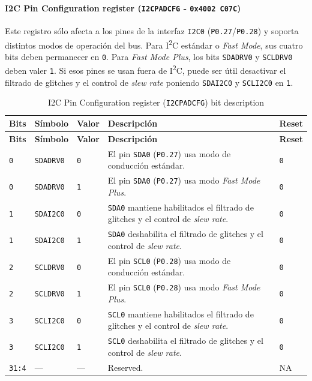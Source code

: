 \paragraph{I2C Pin Configuration register (\texttt{I2CPADCFG} - \texttt{0x4002 C07C})}
Este registro sólo afecta a los pines de la interfaz \texttt{I2C0} (\texttt{P0.27}/\texttt{P0.28}) y soporta distintos modos de operación del bus. Para I\textsuperscript{2}C estándar o \textit{Fast Mode}, sus cuatro bits deben permanecer en \texttt{0}. Para \textit{Fast Mode Plus}, los bits \texttt{SDADRV0} y \texttt{SCLDRV0} deben valer \texttt{1}. Si esos pines se usan fuera de I\textsuperscript{2}C, puede ser útil desactivar el filtrado de glitches y el control de \textit{slew rate} poniendo \texttt{SDAI2C0} y \texttt{SCLI2C0} en \texttt{1}.

\begin{longtable}{|>{\raggedright\arraybackslash}p{}|>{\raggedright\arraybackslash}p{}|>{\raggedright\arraybackslash}p{}|>{\raggedright\arraybackslash}p{}|>{\centering\arraybackslash}p{}|}
\caption{I2C Pin Configuration register (\texttt{I2CPADCFG}) bit description}\\
\hline
\textbf{Bits} & \textbf{Símbolo} & \textbf{Valor} & \textbf{Descripción} & \textbf{Reset} \\
\hline
\endfirsthead
\hline
\textbf{Bits} & \textbf{Símbolo} & \textbf{Valor} & \textbf{Descripción} & \textbf{Reset} \\
\hline
\endhead
\texttt{0} & \texttt{SDADRV0} & \texttt{0} & El pin \texttt{SDA0} (\texttt{P0.27}) usa modo de conducción estándar. & \texttt{0} \\
\hline
\texttt{0} & \texttt{SDADRV0} & \texttt{1} & El pin \texttt{SDA0} (\texttt{P0.27}) usa modo \textit{Fast Mode Plus}. & \texttt{0} \\
\hline
\texttt{1} & \texttt{SDAI2C0} & \texttt{0} & \texttt{SDA0} mantiene habilitados el filtrado de glitches y el control de \textit{slew rate}. & \texttt{0} \\
\hline
\texttt{1} & \texttt{SDAI2C0} & \texttt{1} & \texttt{SDA0} deshabilita el filtrado de glitches y el control de \textit{slew rate}. & \texttt{0} \\
\hline
\texttt{2} & \texttt{SCLDRV0} & \texttt{0} & El pin \texttt{SCL0} (\texttt{P0.28}) usa modo de conducción estándar. & \texttt{0} \\
\hline
\texttt{2} & \texttt{SCLDRV0} & \texttt{1} & El pin \texttt{SCL0} (\texttt{P0.28}) usa modo \textit{Fast Mode Plus}. & \texttt{0} \\
\hline
\texttt{3} & \texttt{SCLI2C0} & \texttt{0} & \texttt{SCL0} mantiene habilitados el filtrado de glitches y el control de \textit{slew rate}. & \texttt{0} \\
\hline
\texttt{3} & \texttt{SCLI2C0} & \texttt{1} & \texttt{SCL0} deshabilita el filtrado de glitches y el control de \textit{slew rate}. & \texttt{0} \\
\hline
\texttt{31:4} & --- & --- & Reserved. & NA \\
\hline
\end{longtable}

\normalsize
